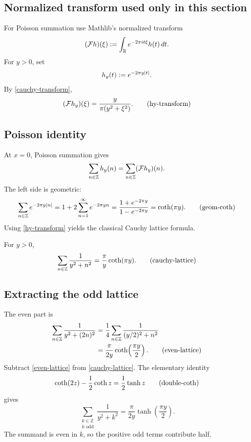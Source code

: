\subsection{Normalized transform used only in this section}

For Poisson summation use Mathlib's normalized transform
\[
  (\mathcal{F} h)(\xi)
  :=\int_{\mathbb{R}}e^{-2\pi i t\xi}h(t)\,dt.
\]
For $y>0$, set
\[
  h_y(t):=e^{-2\pi y\left\lvert t\right\rvert}.
\]
By \eqref{cauchy-transform},
\begin{equation}
  (\mathcal{F} h_y)(\xi)
  =\frac{y}{\pi(y^2+\xi^2)}.
  \tag{hy-transform}\label{hy-transform}
\end{equation}

\subsection{Poisson identity}

At $x=0$, Poisson summation gives
\[
  \sum_{n\in\mathbb Z}h_y(n)
  =\sum_{n\in\mathbb Z}(\mathcal{F} h_y)(n).
\]
The left side is geometric:
\begin{equation}
  \sum_{n\in\mathbb Z}e^{-2\pi y\left\lvert n\right\rvert}
  =1+2\sum_{n=1}^\infty e^{-2\pi yn}
  =\frac{1+e^{-2\pi y}}{1-e^{-2\pi y}}
  =\operatorname{coth}(\pi y).
  \tag{geom-coth}\label{geom-coth}
\end{equation}
Using \eqref{hy-transform} yields the classical Cauchy lattice formula.

\begin{theorem}
For $y>0$,
\begin{equation}
  \sum_{n\in\mathbb Z}\frac1{y^2+n^2}
  =\frac\pi y\operatorname{coth}(\pi y).
  \tag{cauchy-lattice}\label{cauchy-lattice}
\end{equation}
\end{theorem}

\subsection{Extracting the odd lattice}

The even part is
\begin{align}
  \sum_{n\in\mathbb Z}\frac1{y^2+(2n)^2}
  &=\frac14
    \sum_{n\in\mathbb Z}\frac1{(y/2)^2+n^2}
  \notag\\
  &=\frac\pi{2y}\operatorname{coth}\!\left(\frac{\pi y}{2}\right).
  \tag{even-lattice}\label{even-lattice}
\end{align}
Subtract \eqref{even-lattice} from \eqref{cauchy-lattice}. The elementary identity
\begin{equation}
  \operatorname{coth}(2z)-\frac12\operatorname{coth} z
  =\frac12\tanh z
  \tag{double-coth}\label{double-coth}
\end{equation}
gives
\begin{equation}
  \sum_{\substack{k\in\mathbb Z\\ k\text{ odd}}}
    \frac1{y^2+k^2}
  =\frac\pi{2y}\tanh\!\left(\frac{\pi y}{2}\right).
  \tag{odd-lattice}\label{odd-lattice}
\end{equation}
The summand is even in $k$, so the positive odd terms contribute half.

